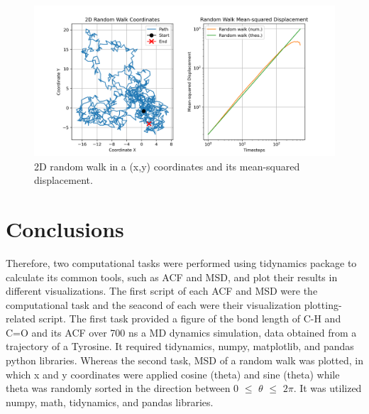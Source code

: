 \documentclass{article}
\begin{document}
\begin{figure}[H]
\includegraphics[width=\linewidth]{msd_plot.png}
\caption{2D random walk in a (x,y) coordinates and its mean-squared displacement.}
\label{fig:msd_plot}
\end{figure}

\section{Conclusions}

Therefore, two computational tasks were performed using tidynamics package to calculate its common tools, such as ACF and MSD, and plot their results in different visualizations. The first script of each ACF and MSD were the computational task and the seacond of each were their visualization plotting-related script. The first task provided a figure of the bond length of C-H and C=O and its ACF over 700 ns a MD dynamics simulation, data obtained from a trajectory of a Tyrosine. It required tidynamics, numpy, matplotlib, and pandas python libraries. Whereas the second task, MSD of a random walk was plotted, in which x and y coordinates were applied cosine (theta) and sine (theta) while theta was randomly sorted in the direction between 0 $\leq$ $\theta$ $\leq$ $2\pi$. It was utilized numpy, math, tidynamics, and pandas libraries. 



\end{document}

